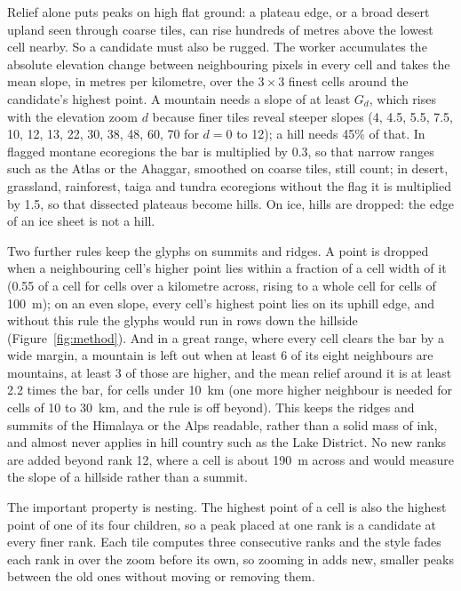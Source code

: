 \documentclass[11pt,a4paper]{article}
\begin{document}
Relief alone puts peaks on high flat ground: a plateau edge, or a broad desert upland seen through coarse tiles, can rise hundreds of metres above the lowest cell nearby. So a candidate must also be rugged. The worker accumulates the absolute elevation change between neighbouring pixels in every cell and takes the mean slope, in metres per kilometre, over the $3\times3$ finest cells around the candidate's highest point. A mountain needs a slope of at least $G_d$, which rises with the elevation zoom $d$ because finer tiles reveal steeper slopes (4, 4.5, 5.5, 7.5, 10, 12, 13, 22, 30, 38, 48, 60, 70 for $d = 0$ to 12); a hill needs 45\% of that. In flagged montane ecoregions the bar is multiplied by 0.3, so that narrow ranges such as the Atlas or the Ahaggar, smoothed on coarse tiles, still count; in desert, grassland, rainforest, taiga and tundra ecoregions without the flag it is multiplied by 1.5, so that dissected plateaus become hills. On ice, hills are dropped: the edge of an ice sheet is not a hill.

Two further rules keep the glyphs on summits and ridges. A point is dropped when a neighbouring cell's higher point lies within a fraction of a cell width of it (0.55 of a cell for cells over a kilometre across, rising to a whole cell for cells of 100~m); on an even slope, every cell's highest point lies on its uphill edge, and without this rule the glyphs would run in rows down the hillside (Figure~\ref{fig:method}). And in a great range, where every cell clears the bar by a wide margin, a mountain is left out when at least 6 of its eight neighbours are mountains, at least 3 of those are higher, and the mean relief around it is at least 2.2 times the bar, for cells under 10~km (one more higher neighbour is needed for cells of 10 to 30~km, and the rule is off beyond). This keeps the ridges and summits of the Himalaya or the Alps readable, rather than a solid mass of ink, and almost never applies in hill country such as the Lake District. No new ranks are added beyond rank 12, where a cell is about 190~m across and would measure the slope of a hillside rather than a summit.

The important property is nesting. The highest point of a cell is also the highest point of one of its four children, so a peak placed at one rank is a candidate at every finer rank. Each tile computes three consecutive ranks and the style fades each rank in over the zoom before its own, so zooming in adds new, smaller peaks between the old ones without moving or removing them.
\end{document}
